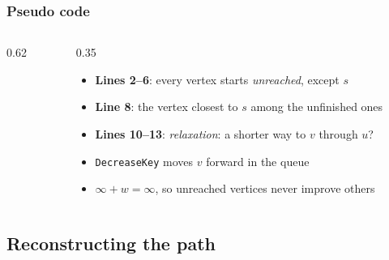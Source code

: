 \documentclass[aspectratio=169,10pt,compress]{beamer}
\begin{document}
\begin{frame}[t,fragile] \frametitle{Pseudo code}
  \begin{columns}[T]
    \begin{column}{0.62\textwidth}
      \SetAlFnt{\scriptsize}


\begin{algorithm}[H]
  \caption{Dijkstra's algorithm}
\end{algorithm}

    \end{column}
    \begin{column}{0.35\textwidth}
      \begin{itemize}\small
        \item \textbf{Lines 2--6}: every vertex starts \emph{unreached}, except $s$
        \item \textbf{Line 8}: the vertex closest to $s$ among the unfinished ones
        \item \textbf{Lines 10--13}: \emph{relaxation}: a shorter way to $v$ through $u$?
        \item \texttt{DecreaseKey} moves $v$ forward in the queue
        \item $\infty + w = \infty$, so unreached vertices never improve others
      \end{itemize}
    \end{column}
  \end{columns}
\end{frame}

\subsection[Path]{Reconstructing the path}
\end{document}

